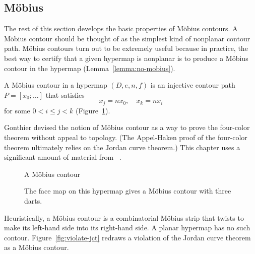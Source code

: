 \subsection{M\"obius}

The rest of this section develops the basic properties of M\"obius
contours.  A M\"obius contour should be thought of as the simplest
kind of nonplanar contour path.  M\"obius contours turn out to be
extremely useful because in practice, the best way to certify that a
given hypermap is nonplanar is to produce a M\"obius contour in the
hypermap (Lemma~\ref{lemma:no-mobius}).

\begin{definition}
 A M\"obius contour in a hypermap
$(D,e,n,f)$ is an
injective contour path $P=[x_0;\ldots]$ that satisfies
\begin{equation}
\label{eqn:mobius}
x_j = n x_0,\quad x_k = n x_i
\end{equation}
for some $0 < i\le j< k$ (Figure~\ref{fig:mobius}).
%
\end{definition}


\begin{remark}
Gonthier devised the notion of M\"obius contour as a way to prove
the four-color theorem without appeal to topology.  (The Appel-Haken
proof of the four-color theorem ultimately relies on the Jordan curve theorem.)
This chapter uses a significant amount of material from ~\cite{Gonthier:2005:FourColor}.
\end{remark}

\begin{figure}[htb]
\centering
{}
\caption{A M\"obius contour}
\label{fig:mobius}
\end{figure}

\begin{figure}[htb]
\centering
{}
\caption{The face map on this hypermap gives a M\"obius contour with
three darts.}
\label{fig:3m}
\end{figure}

\begin{remark}
 Heuristically, a M\"obius contour is a 
combinatorial M\"obius strip that
twists to make 
its left-hand side into
its right-hand side.  A planar hypermap has no such contour.  
Figure~\ref{fig:violate-jct}
redraws a violation of the Jordan curve theorem
as a M\"obius contour.   
\end{remark}

